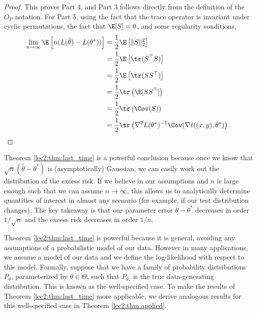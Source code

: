 \begin{proof}
This proves Part 4, and Part 3 follows directly from the definition of the $O_P$ notation. For Part 5, using the fact that the trace operator is invariant under cyclic permutations, the fact that $\E [S] = 0$, and some regularity conditions,
\begin{align}
    \lim_{n \to \infty} \E \left[ n (L(\hat \theta) - L(\theta^*)) \right] &= \frac12 \E\left[ \|S\|_2^2 \right] \\
    &= \frac12 \E \left[ \tr(S^\top S) \right] \\
    &= \frac12 \E \left[ \tr(S S^\top) \right] \\
    &= \frac12 \tr \left(\E[S S^\top] \right) \\
    &= \frac12 \tr \left( \Cov(S) \right) \\
    &= \frac12 \tr\left( \nabla^2 L(\theta^*)^{-1} \Cov(\nabla \ell ((x, y), \theta^*) \right).
\end{align}
\end{proof}

Theorem \ref{lec2:thm:last_time} is a powerful conclusion because once we know that $\sqrt{n}(\hat \theta  - \theta^*)$ is (asymptotically) Gaussian, we can easily work out the distribution of the excess risk. If we believe in our assumptions and $n$ is large enough such that we can assume $n \to \infty$, this allows us to analytically determine quantities of interest in almost any scenario (for example, if our test distribution changes). The key takeaway is that our parameter error $\hat{\theta} - \theta^*$ decreases in order $1/\sqrt{n}$ and the excess risk decreases in order $1/n$.


Theorem \ref{lec2:thm:last_time} is powerful because it is general, avoiding any assumptions of a probabilistic model of our data. However in many applications, we assume a model of our data and we define the log-likelihood with respect to this model. Formally, suppose that we have a family of probability distributions $P_\theta$, parameterized by $\theta \in \Theta$, such that $P_{\theta_*}$ is the true data-generating distribution. This is known as the well-specified case. To make the results of Theorem \ref{lec2:thm:last_time} more applicable, we derive analogous results for this well-specified case in Theorem \ref{lec2:thm:applied}.


